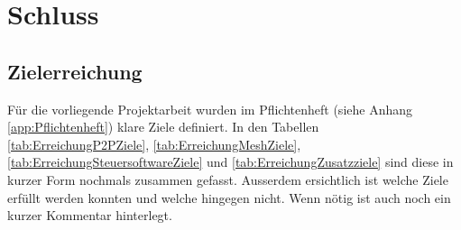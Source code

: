 \clearpage

\section{Schluss}\label{sec:Schluss}


\subsection{Zielerreichung}\label{subsec:Zielerreichung}
Für die vorliegende Projektarbeit wurden im Pflichtenheft (siehe Anhang \ref{app:Pflichtenheft}) klare Ziele definiert. In den Tabellen \ref{tab:ErreichungP2PZiele}, \ref{tab:ErreichungMeshZiele}, \ref{tab:ErreichungSteuersoftwareZiele} und \ref{tab:ErreichungZusatzziele} sind diese in kurzer Form nochmals zusammen gefasst. Ausserdem ersichtlich ist welche Ziele erfüllt werden konnten und welche hingegen nicht. Wenn nötig ist auch noch ein kurzer Kommentar hinterlegt.

